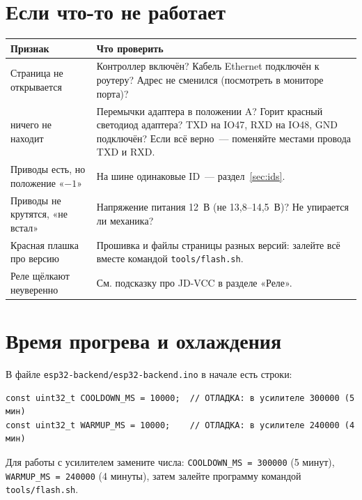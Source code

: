 \documentclass[a4paper,11pt]{article}
\newcommand{\btn}[1]{\fcolorbox{gray!60}{gray!12}{\strut\sffamily\small #1}}
\begin{document}
\section{Если что-то не работает}\label{sec:trouble}

\begin{center}
\noindent\begin{tabularx}{\textwidth}{@{}>{\raggedright}p{}X@{}}
\toprule
\textbf{Признак} & \textbf{Что проверить} \\
\midrule
Страница не открывается &
Контроллер включён? Кабель Ethernet подключён к роутеру? Адрес не сменился
(посмотреть в мониторе порта)? \\
\addlinespace
\btn{Найти приводы} ничего не находит &
Перемычки адаптера в положении A? Горит красный светодиод адаптера? TXD на IO47, RXD на IO48, GND
подключён? Если всё верно~— поменяйте местами провода TXD и RXD. \\
\addlinespace
Приводы есть, но положение «$-1$» & На шине одинаковые ID~— раздел~\ref{sec:ids}. \\
\addlinespace
Приводы не крутятся, «не встал» &
Напряжение питания 12~В (не 13,8--14,5~В)? Не упирается ли механика? \\
\addlinespace
Красная плашка про версию &
Прошивка и файлы страницы разных версий: залейте всё вместе командой \texttt{tools/flash.sh}. \\
\addlinespace
Реле щёлкают неуверенно & См. подсказку про JD-VCC в разделе «Реле». \\
\bottomrule
\end{tabularx}
\end{center}

\section{Время прогрева и охлаждения}\label{sec:timings}

В файле \texttt{esp32-backend/esp32-backend.ino} в начале есть строки:
\begin{verbatim}
const uint32_t COOLDOWN_MS = 10000;  // ОТЛАДКА: в усилителе 300000 (5 мин)
const uint32_t WARMUP_MS = 10000;    // ОТЛАДКА: в усилителе 240000 (4 мин)
\end{verbatim}
Для работы с усилителем замените числа: \texttt{COOLDOWN\_MS = 300000} (5 минут),
\texttt{WARMUP\_MS = 240000} (4 минуты), затем залейте программу командой \texttt{tools/flash.sh}.
\end{document}
